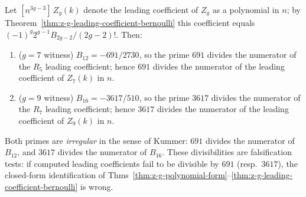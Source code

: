 \begin{theorem}
\label{thm:z-g-kummer-congruence}
\ClaimStatusProvedHere
Let $[n^{3g-3}]\,Z_g(k)$ denote the leading coefficient of $Z_g$ as a
polynomial in $n$; by
Theorem~\ref{thm:z-g-leading-coefficient-bernoulli} this coefficient equals
$(-1)^g2^{g-1}B_{2g-2}/(2g-2)!$. Then:
\begin{enumerate}
\item ($g=7$ witness) $B_{12} = -691/2730$, so the prime $691$ divides the
numerator of the $R_5$ leading coefficient; hence $691$ divides the
numerator of the leading coefficient of $Z_7(k)$ in $n$.
\item ($g=9$ witness) $B_{16} = -3617/510$, so the prime $3617$ divides the
numerator of the $R_7$ leading coefficient; hence $3617$ divides the
numerator of the leading coefficient of $Z_9(k)$ in $n$.
\end{enumerate}
Both primes are \emph{irregular} in the sense of Kummer: $691$ divides the
numerator of $B_{12}$, and $3617$ divides the numerator of $B_{16}$. These
divisibilities are falsification tests: if computed leading coefficients
fail to be divisible by $691$ (resp.\ $3617$), the closed-form identification
of Thms~\ref{thm:z-g-polynomial-form}--\ref{thm:z-g-leading-coefficient-bernoulli}
is wrong.
\end{theorem}

